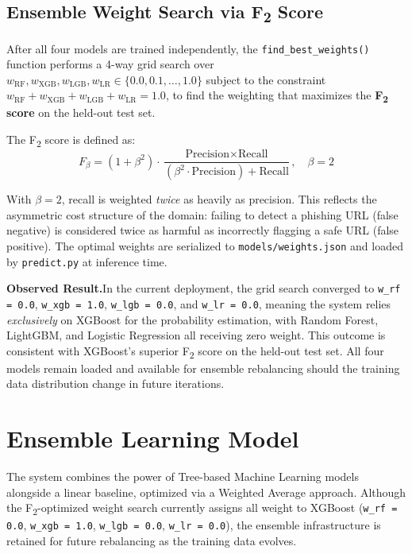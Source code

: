 \documentclass[12pt,a4paper]{article}
\begin{document}
\subsection{Ensemble Weight Search via \texorpdfstring{F\textsubscript{2}}{F2} Score}

After all four models are trained independently, the \texttt{find\_best\_weights()} function performs a 4-way grid search over $w_{\text{RF}}, w_{\text{XGB}}, w_{\text{LGB}}, w_{\text{LR}} \in \{0.0, 0.1, \ldots, 1.0\}$ subject to the constraint $w_{\text{RF}} + w_{\text{XGB}} + w_{\text{LGB}} + w_{\text{LR}} = 1.0$, to find the weighting that maximizes the \textbf{F\textsubscript{2} score} on the held-out test set.

The F\textsubscript{2} score is defined as:
\[
F_\beta = (1 + \beta^2) \cdot \frac{\text{Precision} \times \text{Recall}}{(\beta^2 \cdot \text{Precision}) + \text{Recall}}, \quad \beta = 2
\]

With $\beta = 2$, recall is weighted \textit{twice} as heavily as precision. This reflects the asymmetric cost structure of the domain: failing to detect a phishing URL (false negative) is considered twice as harmful as incorrectly flagging a safe URL (false positive). The optimal weights are serialized to \texttt{models/weights.json} and loaded by \texttt{predict.py} at inference time.

\textbf{Observed Result.}\quad In the current deployment, the grid search converged to \texttt{w\_rf = 0.0}, \texttt{w\_xgb = 1.0}, \texttt{w\_lgb = 0.0}, and \texttt{w\_lr = 0.0}, meaning the system relies \textit{exclusively} on XGBoost for the probability estimation, with Random Forest, LightGBM, and Logistic Regression all receiving zero weight. This outcome is consistent with XGBoost's superior F\textsubscript{2} score on the held-out test set. All four models remain loaded and available for ensemble rebalancing should the training data distribution change in future iterations.

\section{Ensemble Learning Model}

The system combines the power of Tree-based Machine Learning models alongside a linear baseline, optimized via a Weighted Average approach. Although the F\textsubscript{2}-optimized weight search currently assigns all weight to XGBoost (\texttt{w\_rf = 0.0}, \texttt{w\_xgb = 1.0}, \texttt{w\_lgb = 0.0}, \texttt{w\_lr = 0.0}), the ensemble infrastructure is retained for future rebalancing as the training data evolves.
\end{document}
